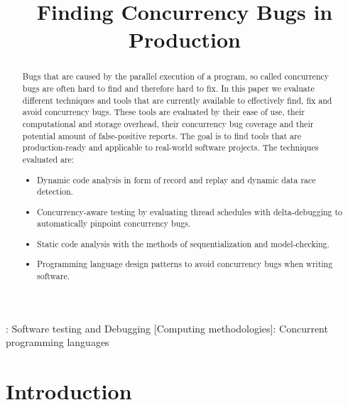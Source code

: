 \documentclass[conference]{IEEEtran}
\begin{document}
\title{Finding Concurrency Bugs in Production}

\author{
}

\maketitle

\begin{abstract}
Bugs that are caused by the parallel execution of a program, so called
concurrency bugs are often hard to find and therefore hard to fix.
In this paper we evaluate different techniques and tools that are currently available to effectively find, fix and avoid concurrency bugs.
These tools are evaluated by their ease of use, their computational and storage overhead, their concurrency bug coverage and their potential amount of false-positive reports.
The goal is to find tools that are production-ready and applicable to real-world software projects.
The techniques evaluated are:
\begin{itemize}
    \item Dynamic code analysis in form of record and replay and dynamic data race detection.
    \item Concurrency-aware testing by evaluating thread schedules with delta-debugging to automatically pinpoint concurrency bugs.
    \item Static code analysis with the methods of sequentialization and model-checking.
    \item Programming language design patterns to avoid concurrency bugs when writing software.
\end{itemize}
\end{abstract}

\begin{IEEEkeywords}
    : Software testing and Debugging
    [Computing methodologies]: Concurrent programming languages
\end{IEEEkeywords}


\section{Introduction}
\end{document}
